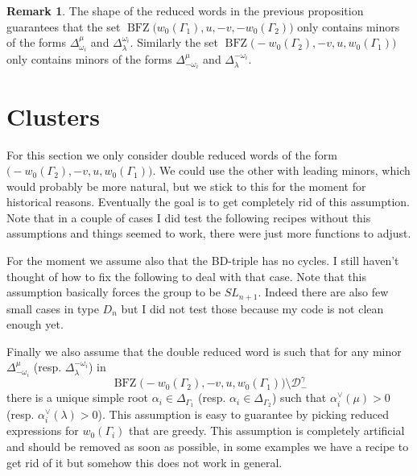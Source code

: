\documentclass[a4paper]{amsart}
\theoremstyle{definition}
\newtheorem{remark}[theorem]{Remark}
\begin{document}
\begin{remark}
  The shape of the reduced words in the previous proposition guarantees that the set $\operatorname{BFZ}\big(w_0(\Gamma_1),u,-v,-w_0(\Gamma_2)\big)$ only contains minors of the forms $\Delta_{\omega_i}^\mu$ and $\Delta_\lambda^{\omega_i}$.
  Similarly the set $\operatorname{BFZ}\big(-w_0(\Gamma_2),-v,u,w_0(\Gamma_1)\big)$ only contains minors of the forms $\Delta_{-\omega_i}^\mu$ and $\Delta_\lambda^{-\omega_i}$.
\end{remark}

\section{Clusters}
For this section we only consider double reduced words of the form $\big(-w_0(\Gamma_2),-v,u,w_0(\Gamma_1)\big)$.
We could use the other with leading minors, which would probably be more natural, but we stick to this for the moment for historical reasons.
Eventually the goal is to get completely rid of this assumption.
Note that in a couple of cases I did test the following recipes without this assumptions and things seemed to work, there were just more functions to adjust.

For the moment we assume also that the BD-triple has no cycles.
I still haven't thought of how to fix the following to deal with that case.
Note that this assumption basically forces the group to be $SL_{n+1}$.
Indeed there are also few small cases in type $D_n$ but I did not test those because my code is not clean enough yet.

Finally we also assume that the double reduced word is such that for any minor $\Delta_{-\omega_i}^\mu$ (resp. $\Delta_{\lambda}^{-\omega_i}$) in 
\[
  \operatorname{BFZ}\big(-w_0(\Gamma_2),-v,u,w_0(\Gamma_1)\big)\setminus \mathcal{D}^\gamma_-
\]
there is a unique simple root $\alpha_i\in\Delta_{\Gamma_1}$ (resp. $\alpha_i\in\Delta_{\Gamma_2}$) such that $\alpha_i^\vee(\mu)>0$ (resp. $\alpha_i^\vee(\lambda)>0$).
This assumption is easy to guarantee by picking reduced expressions for $w_0(\Gamma_i)$ that are greedy.
This assumption is completely artificial and should be removed as soon as possible, in some examples we have a recipe to get rid of it but somehow this does not work in general.
\end{document}
